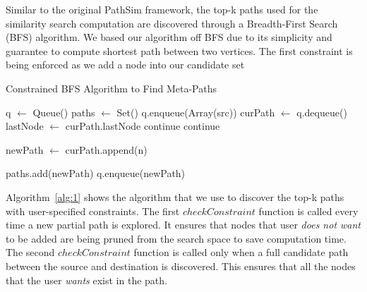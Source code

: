 Similar to the original PathSim framework, the top-k paths used for the
similarity search computation are discovered through a Breadth-First Search
(BFS) algorithm. We based our algorithm off BFS due to its simplicity and guarantee to
compute shortest path between two vertices. The first constraint is being
enforced as we add a node into our candidate set

\begin{algorithm}
    \caption{Constrained BFS Algorithm to Find Meta-Paths}
    \label{alg:1}
    \begin{algorithmic}[1]
            \State q $\gets$ Queue()
            \State paths $\gets$ Set()
            \State q.enqueue(Array(src))
            \State
                \State curPath $\gets$ q.dequeue()
                \State lastNode $\gets$ curPath.lastNode
                        \State continue
                        \State continue
                    \EndIf
                    \State

                    \State newPath $\gets$ curPath.append(n)

                            \State paths.add(newPath)
                        \EndIf
                    \Else
                        \State q.enqueue(newPath)
                    \EndIf
                \EndFor
            \EndWhile
            \State
            \State {}
        \EndFunction
    \end{algorithmic}
\end{algorithm}

Algorithm~\ref{alg:1} shows the algorithm that we use to discover the top-k
paths with user-specified constraints. The first $checkConstraint$ function
is called every time a new partial path is explored. It ensures that nodes
that user \textit{does not want} to be added are being pruned from the search
space to save computation time. The second $checkConstraint$ function
is called only when a full candidate path between the source and destination
is discovered. This ensures that all the nodes that the user \textit{wants}
exist in the path.
